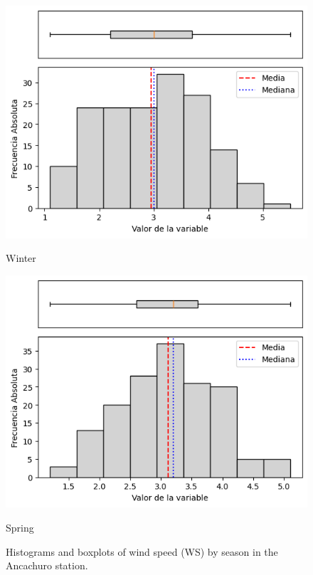 \begin{figure}[htbp]
\vspace{0.2cm}

\begin{minipage}{0.30\textwidth}
  \includegraphics[width=\linewidth]{resultados/por_estacion_del_anio/boxplot_clases_por_estacion/Ancachuro/WS_HistBoxplot_Winter.png}
  \caption*{Winter}
\end{minipage}
\hfill
\begin{minipage}{0.30\textwidth}
  \includegraphics[width=\linewidth]{resultados/por_estacion_del_anio/boxplot_clases_por_estacion/Ancachuro/WS_HistBoxplot_Spring.png}
  \caption*{Spring}
\end{minipage}
\caption{Histograms and boxplots of wind speed (WS) by season in the Ancachuro station.}
\label{fig:ancachuro_ws_hist}
\end{figure}

